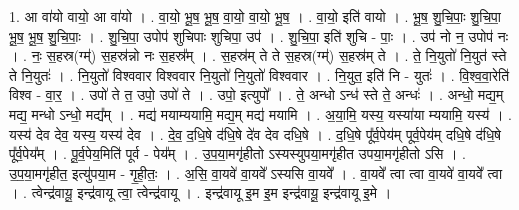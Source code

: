 \documentclass[17pt]{extarticle}
\begin{document}
1. आ वा॑यो वायो॒ आ वा॑यो । . वा॒यो॒ भू॒ष॒ भू॒ष॒ वा॒यो॒ वा॒यो॒ भू॒ष॒ । . वा॒यो॒ इति॑ वायो । . भू॒ष॒ शु॒चि॒पाः॒ शु॒चि॒पा॒ भू॒ष॒ भू॒ष॒ शु॒चि॒पाः॒ । . शु॒चि॒पा॒ उपोप॑ शुचिपाः शुचिपा॒ उप॑ । . शु॒चि॒पा॒ इति॑ शुचि - पाः॒ । . उप॑ नो न॒ उपोप॑ नः । . नः॒ स॒हस्र(ग्म्॑) स॒हस्र॑न्नो नः स॒हस्र᳚म् । . स॒हस्र॑म् ते ते स॒हस्र(ग्म्॑) स॒हस्र॑म् ते । . ते॒ नि॒युतो॑ नि॒युत॑ स्ते ते नि॒युतः॑ । . नि॒युतो॑ विश्ववार विश्ववार नि॒युतो॑ नि॒युतो॑ विश्ववार । . नि॒युत॒ इति॑ नि - युतः॑ । . वि॒श्व॒वा॒रेति॑ विश्व - वा॒र॒ । . उपो॑ ते त॒ उपो॒ उपो॑ ते । . उपो॒ इत्युपो᳚ । . ते॒ अन्धो ऽन्ध॑ स्ते ते॒ अन्धः॑ । . अन्धो॒ मद्य॒म् मद्य॒ मन्धो ऽन्धो॒ मद्य᳚म् । . मद्य॑ मयाम्ययामि॒ मद्य॒म् मद्य॑ मयामि । . अ॒या॒मि॒ यस्य॒ यस्या॑या म्ययामि॒ यस्य॑ । . यस्य॑ देव देव॒ यस्य॒ यस्य॑ देव । . दे॒व॒ द॒धि॒षे द॑धि॒षे दे॑व देव दधि॒षे । . द॒धि॒षे पू᳚र्व॒पेय॑म् पूर्व॒पेय॑म् दधि॒षे द॑धि॒षे पू᳚र्व॒पेय᳚म् । . पू॒र्व॒पेय॒मिति॑ पूर्व - पेय᳚म् । . उ॒प॒या॒मगृ॑हीतो ऽस्यस्युपया॒मगृ॑हीत उपया॒मगृ॑हीतो ऽसि । . उ॒प॒या॒मगृ॑हीत॒ इत्यु॑पया॒म - गृ॒ही॒तः॒ । . अ॒सि॒ वा॒यवे॑ वा॒यवे᳚ ऽस्यसि वा॒यवे᳚ । . वा॒यवे᳚ त्वा त्वा वा॒यवे॑ वा॒यवे᳚ त्वा । . त्वेन्द्र॑वायू॒ इन्द्र॑वायू त्वा॒ त्वेन्द्र॑वायू । . इन्द्र॑वायू इ॒म इ॒म इन्द्र॑वायू॒ इन्द्र॑वायू इ॒मे । \newline
\end{document}
